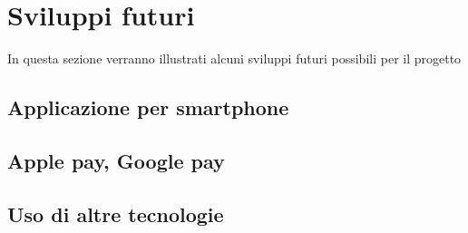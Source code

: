\section{Sviluppi futuri}
In questa sezione verranno illustrati alcuni sviluppi futuri possibili per il progetto
\subsection{Applicazione per smartphone}
\subsection{Apple pay, Google pay}
\subsection{Uso di altre tecnologie}